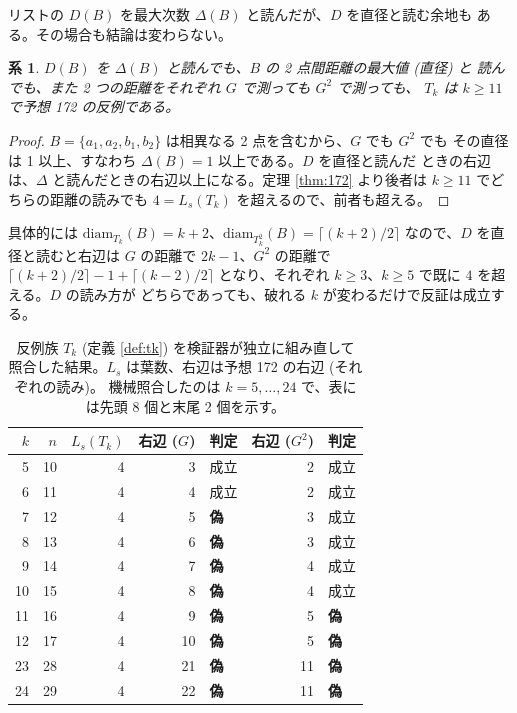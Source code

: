 \documentclass[paper=a4,fontsize=10.5pt,jafontsize=10.5pt]{jlreq}
\theoremstyle{plain}
\newtheorem{corollary}[theorem]{系}
\theoremstyle{definition}
\begin{document}
リストの $D(B)$ を最大次数 $\Delta(B)$ と読んだが、$D$ を直径と読む余地も
ある。その場合も結論は変わらない。

\begin{corollary}\label{cor:172robust}
$D(B)$ を $\Delta(B)$ と読んでも、$B$ の 2 点間距離の最大値 (直径) と
読んでも、また 2 つの距離をそれぞれ $G$ で測っても $G^2$ で測っても、
$T_k$ は $k \ge 11$ で予想 172 の反例である。
\end{corollary}

\begin{proof}
$B = \{a_1, a_2, b_1, b_2\}$ は相異なる 2 点を含むから、$G$ でも $G^2$ でも
その直径は 1 以上、すなわち $\Delta(B) = 1$ 以上である。$D$ を直径と読んだ
ときの右辺は、$\Delta$ と読んだときの右辺以上になる。定理
\ref{thm:172} より後者は $k \ge 11$ でどちらの距離の読みでも $4 = L_s(T_k)$
を超えるので、前者も超える。
\end{proof}

具体的には $\mathrm{diam}_{T_k}(B) = k + 2$、$\mathrm{diam}_{T_k^2}(B) =
\lceil (k+2)/2 \rceil$ なので、$D$ を直径と読むと右辺は $G$ の距離で
$2k - 1$、$G^2$ の距離で $\lceil (k+2)/2 \rceil - 1 + \lceil (k-2)/2 \rceil$
となり、それぞれ $k \ge 3$、$k \ge 5$ で既に $4$ を超える。$D$ の読み方が
どちらであっても、破れる $k$ が変わるだけで反証は成立する。

\begin{table}[t]
\centering
\caption{反例族 $T_k$ (定義 \ref{def:tk}) を検証器が独立に組み直して
照合した結果。$L_s$ は葉数、右辺は予想 172 の右辺 (それぞれの読み)。
機械照合したのは $k = 5, \dots, 24$ で、表には先頭 8 個と末尾
2 個を示す。}
\label{tab:family}
\small
\begin{tabular}{rrrrlrl}
\hline
$k$ & $n$ & $L_s(T_k)$ & 右辺 ($G$) & 判定 & 右辺 ($G^2$) & 判定 \\
\hline
5 & 10 & 4 & 3 & 成立 & 2 & 成立 \\
6 & 11 & 4 & 4 & 成立 & 2 & 成立 \\
7 & 12 & 4 & 5 & \textbf{偽} & 3 & 成立 \\
8 & 13 & 4 & 6 & \textbf{偽} & 3 & 成立 \\
9 & 14 & 4 & 7 & \textbf{偽} & 4 & 成立 \\
10 & 15 & 4 & 8 & \textbf{偽} & 4 & 成立 \\
11 & 16 & 4 & 9 & \textbf{偽} & 5 & \textbf{偽} \\
12 & 17 & 4 & 10 & \textbf{偽} & 5 & \textbf{偽} \\
23 & 28 & 4 & 21 & \textbf{偽} & 11 & \textbf{偽} \\
24 & 29 & 4 & 22 & \textbf{偽} & 11 & \textbf{偽} \\
\hline
\end{tabular}
\end{table}
\end{document}
